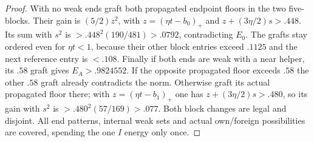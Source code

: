\begin{proof}
With no weak ends graft both propagated endpoint floors in
the two five-blocks. Their gain is $(5/2)z^2$, with
$z=(\eta t-b_0)_+$ and
$z+(3\eta/2)s>.448$.
Its sum with $s^2$ is $>.448^2(190/481)>.0792$,
contradicting $E_0$. The grafts stay ordered even for
$\eta t<1$, because their other block entries exceed $.1125$
and the next reference entry is $<.108$.
Finally if both ends are weak with a near helper, its $.58$
graft gives $E_A>.9824552$. If the opposite propagated floor
exceeds $.58$ the other $.58$ graft already contradicts the norm.
Otherwise graft its actual propagated floor there; with
$z=(\eta t-b_1)_+$ one has
$z+(3\eta/2)s>.480$, so its gain with $s^2$ is
$>.480^2(57/169)>.077$.
Both block changes are legal and disjoint. All end patterns,
internal weak sets and actual own/foreign possibilities are
covered, spending the one $I$ energy only once.
\end{proof}

